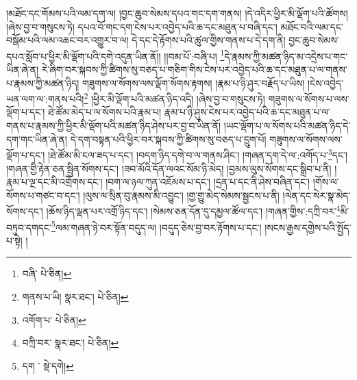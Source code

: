 །མཐོང་དང་གོམས་པའི་ལམ་དག་ལ། །བྱང་ཆུབ་སེམས་དཔའ་གང་དག་གནས། །དེ་འདིར་ཕྱིར་མི་ལྡོག་པའི་ཚོགས། །ཞེས་བྱ་བ་གསུངས་ཏེ། དཔའ་བོ་གང་དག་ངེས་པར་འབྱེད་པའི་ཆ་དང་མཐུན་པ་བཞི་དང་། མཐོང་བའི་ལམ་དང་བསྒོམ་པའི་ལམ་འཆང་བར་འགྱུར་བ་ལ། དེ་དང་དེ་རྟོགས་པའི་ཚུལ་གྱིས་གནས་པ་དེ་དག་ནི། བྱང་ཆུབ་སེམས་དཔའ་སློབ་པ་ཕྱིར་མི་ལྡོག་པའི་དགེ་འདུན་ཡིན་ནོ།། །།བམ་པོ་:བཞི་པ། \footnote{བཞི་  པེ་ཅིན། }དེ་རྣམས་ཀྱི་མཚན་ཉིད་མ་འདྲེས་པ་གང་ཡིན་ཞེ་ན། རེ་ཞིག་བར་སྐབས་ཀྱི་ཚིགས་སུ་བཅད་པ་གཅིག་གིས་ངེས་པར་འབྱེད་པའི་ཆ་དང་མཐུན་པ་ལ་གནས་པ་རྣམས་ཀྱི་མཚན་ཉིད། གཟུགས་ལ་སོགས་ལས་ལྡོག་སོགས་རྟགས། །རྣམ་པ་ཉི་ཤུར་བརྗོད་པ་ཡིས། །ངེས་འབྱེད་ཡན་ལག་ལ་:གནས་པའི།\footnote{གནས་པ་ཡི།  སྣར་ཐང་།  པེ་ཅིན། } །ཕྱིར་མི་ལྡོག་པའི་མཚན་ཉིད་འདི། །ཞེས་བྱ་བ་གསུངས་ཏེ། གཟུགས་ལ་སོགས་པ་ལས་ལྡོག་པ་དང་། ཐེ་ཚོམ་མེད་པ་ལ་སོགས་པའི་རྣམ་པ། རྣམ་པ་ཉི་ཤུས་ངེས་པར་འབྱེད་པའི་ཆ་དང་མཐུན་པ་ལ་གནས་པ་རྣམས་ཀྱི་ཕྱིར་མི་ལྡོག་པའི་མཚན་ཉིད་ཤེས་པར་བྱ་བ་ཡིན་ནོ། །ཡང་ལྡོག་པ་ལ་སོགས་པའི་མཚན་ཉིད་དེ་དག་གང་ཡིན་ཞེ་ན། དེ་དག་བསྟན་པའི་ཕྱིར་བར་སྐབས་ཀྱི་ཚིགས་སུ་བཅད་པ་དྲུག་པོ། གཟུགས་ལ་སོགས་ལས་ལྡོག་པ་དང་། །ཐེ་ཚོམ་མི་ངལ་ཟད་པ་དང་། །བདག་ཉིད་དགེ་བ་ལ་གནས་ཤིང་། །གཞན་དག་དེ་ལ་:འགོད་པ་\footnote{འགོག་པ་  པེ་ཅིན། }དང་། །གཞན་གྱི་རྟེན་ཅན་སྦྱིན་སོགས་དང་། །ཟབ་མོའི་དོན་ལའང་སོམ་ཉི་མེད། །བྱམས་ལུས་སོགས་དང་སྒྲིབ་པ་ནི། །རྣམ་པ་ལྔ་དང་མི་འགྲོགས་དང་། །བག་ལ་ཉལ་ཀུན་འཇོམས་པ་དང་། །དྲན་པ་དང་ནི་ཤེས་བཞིན་དང་། །གོས་ལ་སོགས་པ་གཙང་བ་དང་། །ལུས་ལ་སྲིན་བུ་རྣམས་མི་འབྱུང་། །གྱ་གྱུ་མེད་སེམས་སྦྱངས་པ་ནི། །ལེན་དང་སེར་སྣ་མེད་སོགས་དང་། །ཆོས་ཉིད་ལྡན་པར་འགྲོ་ཉིད་དང་། །སེམས་ཅན་དོན་དུ་དམྱལ་ཚོལ་དང་། །གཞན་གྱིས་:དཀྲི་བར་\footnote{བཀྲི་བར་  སྣར་ཐང་།  པེ་ཅིན། }མི་བཏུབ་དགདང་\footnote{དག ་  སྡེ་དགེ། }ལམ་གཞན་ཉེ་བར་སྟོན་བདུད་ལ། །བདུད་ཅེས་བྱ་བར་རྟོགས་པ་དང་། །སངས་རྒྱས་དགྱེས་པའི་སྤྱོད་པ་སྟེ། །
